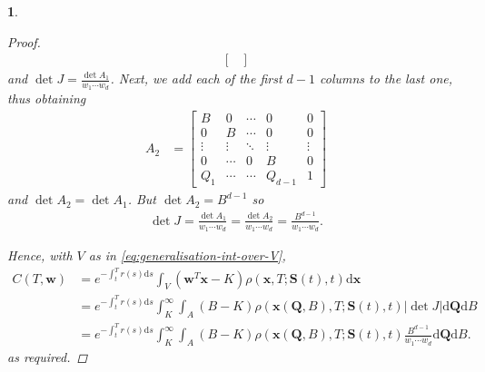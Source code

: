 \documentclass[english]{article}
\numberwithin{equation}{section}
\numberwithin{figure}{section}
\theoremstyle{bolddescit}
\theoremstyle{definition}
\theoremstyle{definition}
\theoremstyle{plain}
\newtheorem{lemma}[theorem]{\protect\lemmaname}
\theoremstyle{plain}
\theoremstyle{bolddesc}
\theoremstyle{plain}
\theoremstyle{remark}
\providecommand{\lemmaname}{Lemma}
\begin{document}
\begin{lemma}
\begin{proof}
\begin{align*}
\begin{bmatrix}
      \end{bmatrix}
    \end{align*}
    and $\det J = \frac{\det A_1}{w_1 \cdots w_d}$. Next, we add each of the first $d-1$ columns to the last one, thus obtaining
    \begin{align*}
      A_2 &= \begin{bmatrix}
        B & 0 & \cdots & 0 & 0\\
        0 & B & \cdots & 0 & 0\\
        \vdots & \vdots & \ddots & \vdots & \vdots\\
        0 & \cdots & 0 & B & 0\\
        Q_1 & \cdots & \cdots & Q_{d-1} & 1
      \end{bmatrix}
    \end{align*}
    and $\det A_2 = \det A_1$. But $\det A_2 = B^{d-1}$ so
    \begin{align*}
      \det J = \frac{\det A_1}{w_1 \cdots w_d} = \frac{\det A_2}{w_1 \cdots w_d} = \frac{B^{d-1}}{w_1 \cdots w_d}.
    \end{align*}

    Hence, with $V$ as in \eqref{eq:generalisation-int-over-V},
    \begin{align*}
      C(T,\mathbf{w})
      &= e^{-\int_t^T r(s) \mathrm{d}s} \int_V \left(\mathbf{w}^T\mathbf{x} - K\right) \rho(\mathbf{x},T;\mathbf{S}(t),t) \mathrm{d}\mathbf{x}\\
      &= e^{-\int_t^T r(s) \mathrm{d}s} \int_K^\infty \int_A \left(B - K\right) \rho(\mathbf{x}(\mathbf{Q},B),T;\mathbf{S}(t),t) |\det J| \mathrm{d}\mathbf{Q} \mathrm{d}B\\
      &= e^{-\int_t^T r(s) \mathrm{d}s} \int_K^\infty \int_A \left(B - K\right) \rho(\mathbf{x}(\mathbf{Q},B),T;\mathbf{S}(t),t) \frac{B^{d-1}}{w_1 \cdots w_d} \mathrm{d}\mathbf{Q} \mathrm{d}B.
    \end{align*}
    as required.
  \end{proof}
\end{lemma}
\end{document}

